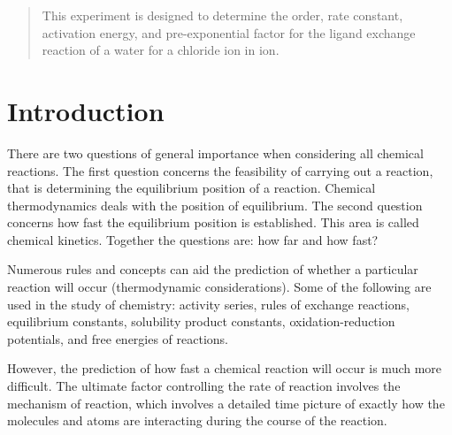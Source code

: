 \maketitle

\begin{abstract}
\noindent This experiment is designed to determine the order, rate constant, activation energy, and pre-exponential factor for the ligand exchange reaction of a water for a chloride ion in  ion.
\end{abstract}

\section{Introduction}
\label{sec:intro}
There are two questions of general importance when considering all chemical reactions. 
The first question concerns the feasibility of carrying out a reaction, that is determining the equilibrium position of a reaction. 
Chemical thermodynamics deals with the position of equilibrium. 
The second question concerns how fast the equilibrium position is established. 
This area is called chemical kinetics. 
Together the questions are: how far and how fast?

Numerous rules and concepts can aid the prediction of whether a particular reaction will occur (thermodynamic considerations). Some of the following are used in the study of chemistry: activity series, rules of exchange reactions, equilibrium constants, solubility product constants, oxidation-reduction potentials, and free energies of reactions.

However, the prediction of how fast a chemical reaction will occur is much more difficult. 
The ultimate factor controlling the rate of reaction involves the mechanism of reaction, which involves a detailed time picture of exactly how the molecules and atoms are interacting during the course of the reaction.

